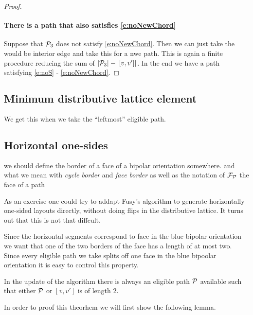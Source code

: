 \begin{proof}

\paragraph{There is a path that also satisfies \ref{e:noNewChord}}
Suppose that $\P_3$ does not satisfy \ref{e:noNewChord}. Then we can just take the would be interior edge and take this for a nwe path. This is again a finite procedure reducing the sum of $|\P_3| -|[v,v']|$. In the end we have a path satisfying \ref{e:noS} - \ref{e:noNewChord}.



\end{proof}

\subsection{Minimum distributive lattice element}
\label{ss:minimal}
We get this when we take the    ``leftmost'' eligible path.

\renewcommand{\F}{\scr F}
\subsection{Horizontal one-sides}
\label{ss:blue}
\note we should define the border of a face of a bipolar orientation somewhere.
\note and what we mean with \emph{cycle border} and \emph{face border}
\note as well as the notation of $\F_\P$ the face of a path

As an exercise one could try to addapt Fusy's algorithm to generate horizontally one-sided layouts directly, without doing flips in the distributive lattice. It turns out that this is not that diffcult.

Since the horizontal segments correspond to face in the blue bipolar orientation we want that one of the two borders of the face has a length of at most two. Since every eligible path we take splits off one face in the blue bipoolar orientation it is easy to control this property.

\begin{thrm}
\label{th:blueelig}
In the update of the algorithm there is always an eligible path $\P$ available such that either $\P$ or $[v,v']$ is of length $2$.
\end{thrm}

In order to proof this theorhem we will first show the following lemma.

